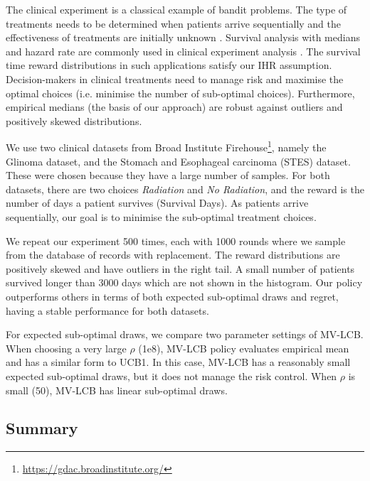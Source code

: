 The clinical experiment is a classical example of bandit problems. The type of treatments needs to be determined when patients arrive sequentially and the effectiveness of treatments are initially unknown \cite{thompson1933likelihood}.
Survival analysis with medians and hazard rate are commonly used in clinical experiment analysis \cite{panaphut_ceftriaxone_2003, panaput_dialysis_2014}.
The survival time reward distributions in such applications satisfy our IHR assumption.
Decision-makers in clinical treatments need to manage risk and maximise the optimal choices (i.e. minimise the number of sub-optimal choices).
Furthermore, empirical medians (the basis of our approach) are robust against outliers and positively skewed distributions.

We use two clinical datasets from Broad Institute Firehouse\footnote{\url{https://gdac.broadinstitute.org/}
}, namely the Glinoma dataset, and the Stomach and Esophageal carcinoma (STES) dataset.
These were chosen because they have a large number of samples.
For both datasets, there are two choices \textit{Radiation} and \textit{No Radiation},
and the reward is the number of days a patient survives (Survival Days).
As patients arrive sequentially, our goal is to minimise the sub-optimal treatment choices.

We repeat our experiment 500 times, each with 1000 rounds where we sample from
the database of records with replacement.
The reward distributions are positively skewed and have outliers in the right tail.
A small number of patients survived longer than 3000 days which are not shown in the histogram.
Our policy outperforms others in terms of both expected sub-optimal draws and regret, having a stable performance for both datasets.

For expected sub-optimal draws, we compare two parameter settings of MV-LCB.  When choosing a very large $\rho$ (1e8), MV-LCB policy evaluates empirical mean and has a similar form to UCB1. In this case, MV-LCB has a reasonably small expected sub-optimal draws, but it does not manage the risk control. When $\rho$ is small (50), MV-LCB has linear sub-optimal draws.
\subsection{Summary}
\label{sec: Discussion}

